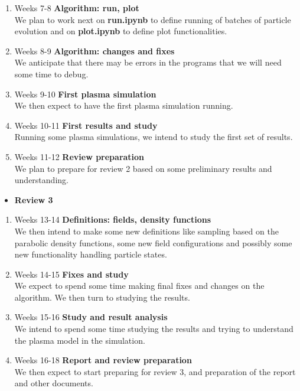 \documentclass[12pt]{article}
\begin{document}
		\begin{enumerate}
			\item Weeks 7-8 \textbf{Algorithm: run, plot} \\
			We plan to work next on \textbf{run.ipynb} to define running of batches of particle evolution and on \textbf{plot.ipynb} to define plot functionalities.
			\item Weeks 8-9 \textbf{Algorithm: changes and fixes}\\
			We anticipate that there may be errors in the programs that we will need some time to debug.
			\item Weeks 9-10 \textbf{First plasma simulation}\\
			We then expect to have the first plasma simulation running.
			\item Weeks 10-11 \textbf{First results and study}\\
			Running some plasma simulations, we intend to study the first set of results.
			\item Weeks 11-12 \textbf{Review preparation}\\
			We plan to prepare for review 2 based on some preliminary results and understanding.
		\end{enumerate}
		\begin{itemize}
			\item \textbf{Review 3}
		\end{itemize}
		\begin{enumerate}
			\item Weeks 13-14 \textbf{Definitions: fields, density functions}\\
			We then intend to make some new definitions like sampling based on the parabolic density functions, some new field configurations and possibly some new functionality handling particle states.
		\item Weeks 14-15 \textbf{Fixes and study}\\
		We expect to spend some time making final fixes and changes on the algorithm. We then turn to studying the results.
		\item Weeks 15-16 \textbf{Study and result analysis}\\
		We intend to spend some time studying the results and trying to understand the plasma model in the simulation.
		\item Weeks 16-18 \textbf{Report and review preparation}\\
		We then expect to start preparing for review 3, and preparation of the report and other documents.
		\end{enumerate}
	
\end{document}
